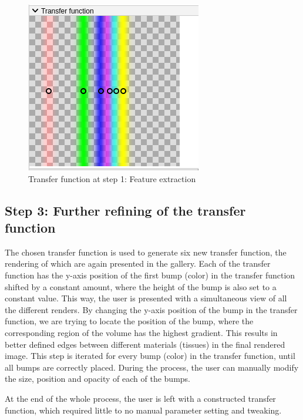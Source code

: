 \documentclass{egpubl-eurovis-short}
\begin{document}
\begin{figure}[htb]
  \includegraphics[width=.8\linewidth]{tf.png}
   \caption{\label{fig:tf}
     Transfer function at step 1: Feature extraction}
\end{figure}

\subsection{Step 3: Further refining of the transfer function}
The chosen transfer function is used to generate six new transfer function, the rendering of which are again presented in the gallery. Each of the transfer function has the y-axis position of the first bump (color) in the transfer function shifted by a constant amount, where the height of the bump is also set to a constant value. 
This way, the user is presented with a simultaneous view of all the different renders. 
By changing the y-axis position of the bump in the transfer function, we are trying to locate the position of the bump, where the corresponding region of the volume has the highest gradient. This results in better defined edges between different materials (tissues) in the final rendered image.
This step is iterated for every bump (color) in the transfer function, until all bumps are correctly placed. During the process, the user can manually modify the size, position and opacity of each of the bumps. 

At the end of the whole process, the user is left with a constructed transfer function, which required little to no manual parameter setting and tweaking.
 
\end{document}
